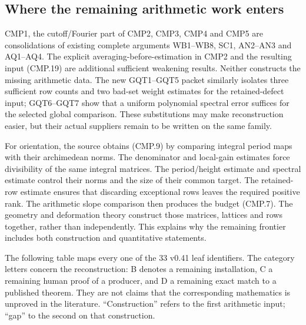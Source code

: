 \subsection{Where the remaining arithmetic work enters}

CMP1, the cutoff/Fourier part of CMP2, CMP3, CMP4 and CMP5 are
consolidations of existing complete arguments WB1--WB8, SC1,
AN2--AN3 and AQ1--AQ4.  The explicit averaging-before-estimation
in CMP2 and the resulting input (CMP.19) are additional sufficient
weakening results.  Neither constructs the missing arithmetic data.
The new GQT1--GQT5 packet similarly isolates three sufficient row
counts and two bad-set weight estimates for the retained-defect
input; GQT6--GQT7 show that a uniform polynomial spectral error
suffices for the selected global comparison.  These substitutions
may make reconstruction easier, but their actual suppliers remain
to be written on the same family.

For orientation, the source obtains (CMP.9) by comparing integral
period maps with their archimedean norms.  The denominator and
local-gain estimates force divisibility of the same integral
matrices.  The period/height estimate and spectral estimate control
their norms and the size of their common target.  The retained-row
estimate ensures that discarding exceptional rows leaves the
required positive rank.  The arithmetic slope comparison then
produces the budget (CMP.7).  The geometry and deformation theory
construct those matrices, lattices and rows together, rather than
independently.  This explains why the remaining frontier includes
both construction and quantitative statements.

The following table maps every one of the 33 v0.41 leaf identifiers.
The category letters concern the reconstruction: B denotes a
remaining installation, C a remaining human proof of a producer,
and D a remaining exact match to a published theorem.  They are
not claims that the corresponding mathematics is unproved in the
literature.  ``Construction'' refers to the first arithmetic input;
``gap'' to the second on that construction.

